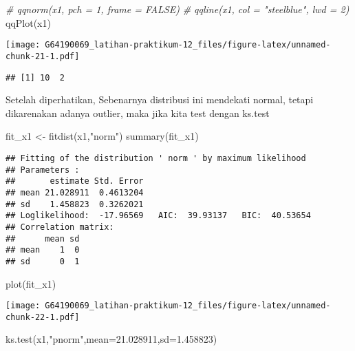 \documentclass[
]{article}
\newenvironment{Shaded}{\begin{snugshade}}{\end{snugshade}}
\newcommand{\AttributeTok}[1]{\textcolor[rgb]{0.77,0.63,0.00}{#1}}
\newcommand{\CommentTok}[1]{\textcolor[rgb]{0.56,0.35,0.01}{\textit{#1}}}
\newcommand{\FloatTok}[1]{\textcolor[rgb]{0.00,0.00,0.81}{#1}}
\newcommand{\FunctionTok}[1]{\textcolor[rgb]{0.00,0.00,0.00}{#1}}
\newcommand{\NormalTok}[1]{#1}
\newcommand{\OtherTok}[1]{\textcolor[rgb]{0.56,0.35,0.01}{#1}}
\newcommand{\StringTok}[1]{\textcolor[rgb]{0.31,0.60,0.02}{#1}}
\begin{document}
\begin{Shaded}
\begin{Highlighting}[]
\CommentTok{\# qqnorm(x1, pch = 1, frame = FALSE)}
\CommentTok{\# qqline(x1, col = "steelblue", lwd = 2)}
\FunctionTok{qqPlot}\NormalTok{(x1)}
\end{Highlighting}
\end{Shaded}

\texttt{[image: G64190069\_latihan-praktikum-12\_files/figure-latex/unnamed-chunk-21-1.pdf]}

\begin{verbatim}
## [1] 10  2
\end{verbatim}

Setelah diperhatikan, Sebenarnya distribusi ini mendekati normal, tetapi
dikarenakan adanya outlier, maka jika kita test dengan ks.test

\begin{Shaded}
\begin{Highlighting}[]
\NormalTok{fit\_x1 }\OtherTok{\textless{}{-}} \FunctionTok{fitdist}\NormalTok{(x1,}\StringTok{"norm"}\NormalTok{)}
\FunctionTok{summary}\NormalTok{(fit\_x1)}
\end{Highlighting}
\end{Shaded}

\begin{verbatim}
## Fitting of the distribution ' norm ' by maximum likelihood 
## Parameters : 
##       estimate Std. Error
## mean 21.028911  0.4613204
## sd    1.458823  0.3262021
## Loglikelihood:  -17.96569   AIC:  39.93137   BIC:  40.53654 
## Correlation matrix:
##      mean sd
## mean    1  0
## sd      0  1
\end{verbatim}

\begin{Shaded}
\begin{Highlighting}[]
\FunctionTok{plot}\NormalTok{(fit\_x1)}
\end{Highlighting}
\end{Shaded}

\texttt{[image: G64190069\_latihan-praktikum-12\_files/figure-latex/unnamed-chunk-22-1.pdf]}

\begin{Shaded}
\begin{Highlighting}[]
\FunctionTok{ks.test}\NormalTok{(x1,}\StringTok{"pnorm"}\NormalTok{,}\AttributeTok{mean=}\FloatTok{21.028911}\NormalTok{,}\AttributeTok{sd=}\FloatTok{1.458823}\NormalTok{)}
\end{Highlighting}
\end{Shaded}
\end{document}
